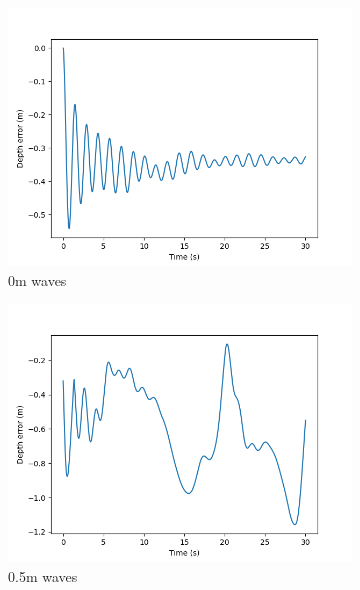 \documentclass[class=article, crop=false]{standalone}
\begin{document}
\begin{figure}
    \centering
    \begin{subfigure}{0.65\textwidth}
        \centering
        \includegraphics{scenario1/rov-100m/0.0m/rov_depth_error_controlled}
        \caption{0m waves}
    \end{subfigure}
    \vfill
    \begin{subfigure}{0.65\textwidth}
        \centering
        \includegraphics{scenario1/rov-100m/0.5m/rov_depth_error_controlled}
        \caption{0.5m waves}
    \end{subfigure}
    \vfill
    \begin{subfigure}{0.65\textwidth}
        \centering

\end{subfigure}
\end{figure}
\end{document}
